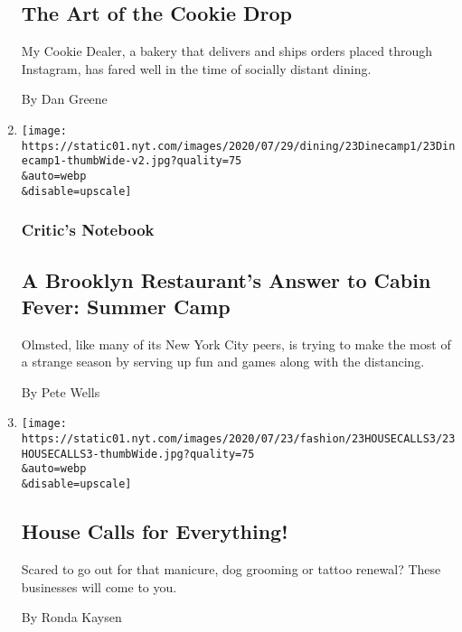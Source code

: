 \begin{enumerate}
  \hypertarget{the-art-of-the-cookie-drop}{%
  \subsection{The Art of the Cookie
  Drop}\label{the-art-of-the-cookie-drop}}

  My Cookie Dealer, a bakery that delivers and ships orders placed
  through Instagram, has fared well in the time of socially distant
  dining.

  By Dan Greene
\item
  \href{/2020/07/23/dining/outdoor-dining-olmsted-summer-camp.html}{}

  \texttt{[image: https://static01.nyt.com/images/2020/07/29/dining/23Dinecamp1/23Dinecamp1-thumbWide-v2.jpg?quality=75\\\&auto=webp\\\&disable=upscale]}

  \hypertarget{critics-notebook-2}{%
  \subsubsection{Critic's Notebook}\label{critics-notebook-2}}

  \hypertarget{a-brooklyn-restaurants-answer-to-cabin-fever-summer-camp}{%
  \subsection{A Brooklyn Restaurant's Answer to Cabin Fever: Summer
  Camp}\label{a-brooklyn-restaurants-answer-to-cabin-fever-summer-camp}}

  Olmsted, like many of its New York City peers, is trying to make the
  most of a strange season by serving up fun and games along with the
  distancing.

  By Pete Wells
\item
  \href{/2020/07/23/style/coronavirus-manicures-haircuts-tattoos-dog-groomer-at-home.html}{}

  \texttt{[image: https://static01.nyt.com/images/2020/07/23/fashion/23HOUSECALLS3/23HOUSECALLS3-thumbWide.jpg?quality=75\\\&auto=webp\\\&disable=upscale]}

  \hypertarget{house-calls-for-everything}{%
  \subsection{House Calls for
  Everything!}\label{house-calls-for-everything}}

  Scared to go out for that manicure, dog grooming or tattoo renewal?
  These businesses will come to you.

  By Ronda Kaysen
\end{enumerate}

